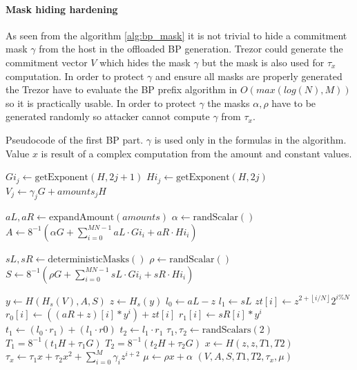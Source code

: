 \documentclass[]{article}
\newcommand{\floor}[1]{\left\lfloor #1 \right\rfloor}
\begin{document}
\paragraph{Mask hiding hardening}

As seen from the algorithm \ref{alg:bp_mask} it is not trivial to hide a commitment mask $\gamma$ from the host in the offloaded BP generation. Trezor could generate the commitment vector $V$ which hides the mask $\gamma$ but the mask is also used for $\tau_x$ computation. In order to protect $\gamma$ and ensure all masks are properly generated the Trezor have to evaluate the BP prefix algorithm in $O(max(log(N), M))$ so it is practically usable. In order to protect $\gamma$ the masks $\alpha, \rho$ have to be generated randomly so attacker cannot compute $\gamma$ from $\tau_x$.

\makeatletter
{}
\makeatother

\begin{algorithm}[]
	\caption{Pseudocode of the first BP part. $\gamma$ is used only in the formulas in the algorithm. Value $x$ is result of a complex computation from the amount and constant values. } \label{alg:bp_mask}
	\begin{algorithmic}[1]
		\State {}
		\State $Gi_j \gets \text{getExponent}(H, 2j + 1)$ 	
		\State $Hi_j \gets \text{getExponent}(H, 2j)$ 	
		\State $V_j \gets \gamma_j G + amounts_j H$
		
		\State {}
		\State $aL, aR \gets \text{expandAmount}(amounts)$
		\State $\alpha \gets \text{randScalar}()$
		\State $A \gets 8^{-1} \left( \alpha G + \sum_{i=0}^{MN-1} aL \cdot Gi_i + aR \cdot Hi_i\right) $
		
		\State {}
		\State $sL, sR \gets \text{deterministicMasks}()$	
		\State $\rho \gets \text{randScalar}()$
		\State $S \gets 8^{-1} \left( \rho G + \sum_{i=0}^{MN-1} sL \cdot Gi_i + sR \cdot Hi_i\right) $
		
		\State {}
		\State $y \gets H(H_s(V), A, S)$
		\State $z \gets H_s(y)$		
		\State {}
		\State $l_0 \gets aL - z$
		\State $l_1 \gets sL$
		\State $zt[i] \gets z^{2 + \floor{i/N}} 2^{i \% N}$
		\State $r_0[i] \gets ((aR + z)[i] * y^{i}) + zt[i]$
		\State $r_1[i] \gets sR[i] * y^{i}$
		\State $t_1 \gets (l_0 \cdot r_1) + (l_1 \cdot r0)$ 
		\State $t_2 \gets l_1 \cdot r_1$ 
		\State
		\State $\tau_1, \tau_2 \gets \text{randScalars}(2)$
		\State $T_1 = 8^{-1} \left(t_1H + \tau_1G\right)$
		\State $T_2 = 8^{-1} \left(t_2H + \tau_2G\right)$
		\State $x \gets H(z, z, T1, T2)$ 
		\State $\tau_x \gets \tau_1 x + \tau_2 x^2 + \sum_{i=0}^{M} \gamma_i z^{i+2}$
		\State $\mu \gets \rho x + \alpha$
		\State \Return $(V, A, S, T1, T2, \tau_x, \mu)$
		\EndFunction	
	\end{algorithmic}
\end{algorithm}
\end{document}
